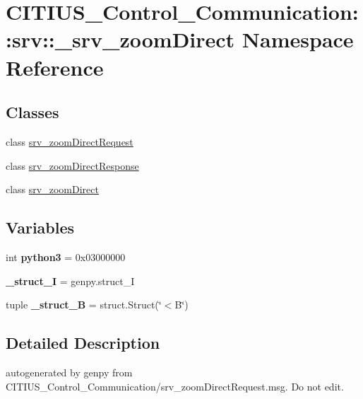 \hypertarget{namespace_c_i_t_i_u_s___control___communication_1_1srv_1_1__srv__zoom_direct}{\section{\-C\-I\-T\-I\-U\-S\-\_\-\-Control\-\_\-\-Communication\-:\-:srv\-:\-:\-\_\-srv\-\_\-zoom\-Direct \-Namespace \-Reference}
\label{namespace_c_i_t_i_u_s___control___communication_1_1srv_1_1__srv__zoom_direct}
}
\subsection*{\-Classes}
\begin{DoxyCompactItemize}
\item 
class \hyperlink{class_c_i_t_i_u_s___control___communication_1_1srv_1_1__srv__zoom_direct_1_1srv__zoom_direct_request}{srv\-\_\-zoom\-Direct\-Request}
\item 
class \hyperlink{class_c_i_t_i_u_s___control___communication_1_1srv_1_1__srv__zoom_direct_1_1srv__zoom_direct_response}{srv\-\_\-zoom\-Direct\-Response}
\item 
class \hyperlink{class_c_i_t_i_u_s___control___communication_1_1srv_1_1__srv__zoom_direct_1_1srv__zoom_direct}{srv\-\_\-zoom\-Direct}
\end{DoxyCompactItemize}
\subsection*{\-Variables}
\begin{DoxyCompactItemize}
\item 
\hypertarget{namespace_c_i_t_i_u_s___control___communication_1_1srv_1_1__srv__zoom_direct_acf6baa469d6cab2ad3e6ffd4c7062f3f}{int {\bfseries python3} = 0x03000000}\label{namespace_c_i_t_i_u_s___control___communication_1_1srv_1_1__srv__zoom_direct_acf6baa469d6cab2ad3e6ffd4c7062f3f}

\item 
\hypertarget{namespace_c_i_t_i_u_s___control___communication_1_1srv_1_1__srv__zoom_direct_a3532f72ac9ee357dbda46725f1d1020d}{{\bfseries \-\_\-struct\-\_\-\-I} = genpy.\-struct\-\_\-\-I}\label{namespace_c_i_t_i_u_s___control___communication_1_1srv_1_1__srv__zoom_direct_a3532f72ac9ee357dbda46725f1d1020d}

\item 
\hypertarget{namespace_c_i_t_i_u_s___control___communication_1_1srv_1_1__srv__zoom_direct_af9121a3cc7308d8c759eda24d75abe3f}{tuple {\bfseries \-\_\-struct\-\_\-\-B} = struct.\-Struct(\char`\"{}$<$\-B\char`\"{})}\label{namespace_c_i_t_i_u_s___control___communication_1_1srv_1_1__srv__zoom_direct_af9121a3cc7308d8c759eda24d75abe3f}

\end{DoxyCompactItemize}


\subsection{\-Detailed \-Description}
\begin{DoxyVerb}autogenerated by genpy from CITIUS_Control_Communication/srv_zoomDirectRequest.msg. Do not edit.\end{DoxyVerb}
 